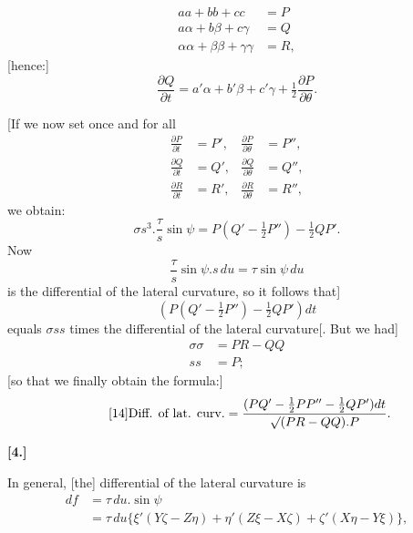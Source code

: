 %
\[
\begin{aligned}
aa+bb+cc&=P\\
a\alpha+b\beta+c\gamma&=Q\\
\alpha\alpha+\beta\beta+\gamma\gamma&=R,
\end{aligned}
\]
[hence:]
\[
\frac{\partial Q}{\partial t}=a'\alpha+b'\beta+c'\gamma+\tfrac12\frac{\partial P}{\partial\theta}.
\]

[If we now set once and for all
\[
\begin{aligned}
\frac{\partial P}{\partial t}&=P',&\frac{\partial P}{\partial\theta}&=P'',\\
\frac{\partial Q}{\partial t}&=Q',&\frac{\partial Q}{\partial\theta}&=Q'',\\
\frac{\partial R}{\partial t}&=R',&\frac{\partial R}{\partial\theta}&=R'',
\end{aligned}
\]
we obtain:
\[
\sigma s^3.\frac{\tau}{s}\sin\psi=P(Q'-\tfrac12P'')-\tfrac12QP'.
\]
Now
\[
\frac{\tau}{s}\sin\psi.s\,du=\tau\sin\psi\,du
\]
is the differential of the lateral curvature, so it follows that]
\[
(P(Q'-\tfrac12P'')-\tfrac12QP')dt
\]
equals $\sigma ss$ times the differential of the lateral curvature[. But we had]
\[
\begin{aligned}
\sigma\sigma&=PR-QQ\\
ss&=P;
\end{aligned}
\]
[so that we finally obtain the formula:]
\begin{equation}\tag*{[14]}
\text{Diff. of lat. curv.}=\frac{(PQ'-\tfrac12PP''-\tfrac12QP')dt}{\mathord{\surd}(PR-QQ).P}.
\end{equation}
\begin{center}\bfseries [4.]\end{center}
\noindent\hspace*{1.2em}In general, [the] differential of the lateral curvature is
\[
\begin{aligned}
df&=\tau\,du.\sin\psi\\
&=\tau\,du\{\xi'(Y\zeta-Z\eta)+\eta'(Z\xi-X\zeta)+\zeta'(X\eta-Y\xi)\},
\end{aligned}
\]
